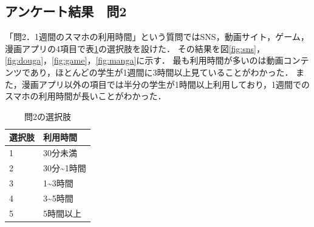 \documentclass[12pt,a4j,titlepage]{ltjsarticle}
\begin{document}
\clearpage

\subsection{アンケート結果　問2}
「問2．1週間のスマホの利用時間」という質問ではSNS，動画サイト，ゲーム，漫画アプリの4項目で表\ref{tb:anke1_2}の選択肢を設けた．
その結果を図\ref{fig:sns}，\ref{fig:douga}，\ref{fig:game}，\ref{fig:manga}に示す．
最も利用時間が多いのは動画コンテンツであり，ほとんどの学生が1週間に3時間以上見ていることがわかった．
また，漫画アプリ以外の項目では半分の学生が1時間以上利用しており，1週間でのスマホの利用時間が長いことがわかった．

\begin{table}[htbp]
  \caption{問2の選択肢}
  \begin{center}
\begin{tabular}{ll}\hline
               選択肢 & 利用時間 \\ \hline
               1 & 30分未満\\
               2 & 30分\textasciitilde1時間\\
               3 & 1\textasciitilde3時間\\
               4 & 3\textasciitilde5時間\\
               5 & 5時間以上\\
              \hline
               \end{tabular}
               \end{center}
               \label{tb:anke1_2}
               \end{table}
\clearpage
\end{document}
